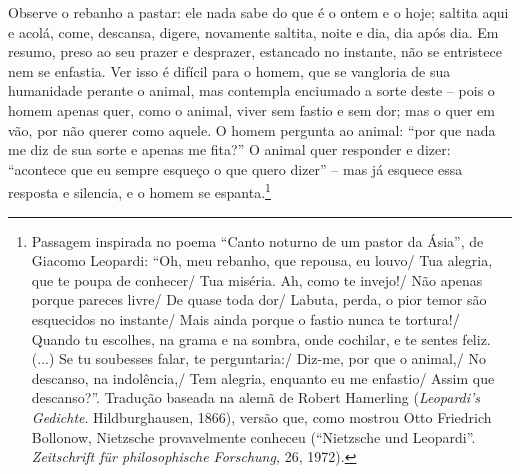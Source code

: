 Observe o rebanho a pastar: ele nada sabe do que é o ontem e o hoje;
saltita aqui e acolá, come, descansa, digere, novamente saltita, noite e
dia, dia após dia. Em resumo, preso ao seu prazer e desprazer, estancado
no instante, não se entristece nem se enfastia. Ver isso é difícil para
o homem, que se vangloria de sua humanidade perante o animal, mas
contempla enciumado a sorte deste -- pois o homem apenas quer, como o
animal, viver sem fastio e sem dor; mas o quer em vão, por não querer
como aquele. O homem pergunta ao animal: ``por que nada me diz de sua
sorte e apenas me fita?'' O animal quer responder e dizer: ``acontece que eu
sempre esqueço o que quero dizer'' -- mas já esquece essa resposta e
silencia, e o homem se espanta.\footnote{Passagem inspirada no poema
  ``Canto noturno de um pastor da Ásia'', de Giacomo Leopardi: ``Oh, meu
  rebanho, que repousa, eu louvo/ Tua alegria, que te poupa de
  conhecer/ Tua miséria. Ah, como te invejo!/ Não apenas porque pareces
  livre/ De quase toda dor/ Labuta, perda, o pior temor são esquecidos no
  instante/ Mais ainda porque o fastio nunca te tortura!/ Quando tu
  escolhes, na grama e na sombra, onde cochilar, e te sentes feliz.
  (...) Se tu soubesses falar, te perguntaria:/ Diz-me, por que o
  animal,/ No descanso, na indolência,/ Tem alegria, enquanto eu me
  enfastio/ Assim que descanso?''. Tradução baseada na alemã de
  Robert Hamerling (\emph{Leopardi's Gedichte}. Hildburghausen, 1866),
  versão que, como mostrou Otto Friedrich Bollonow, Nietzsche
  provavelmente conheceu (``Nietzsche und Leopardi''. \emph{Zeitschrift
  für philosophische Forschung,} 26, 1972).}

